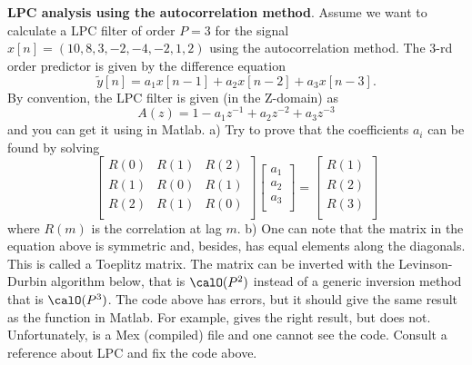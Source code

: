 \begin{exercises}
\item \textbf{LPC analysis using the autocorrelation method}. Assume
we want to calculate a LPC filter of order $P=3$ for the signal
$x[n]=(10, 8, 3, -2, -4, -2, 1, 2)$ using the autocorrelation
method. The 3-rd order predictor is given by the difference
equation
$$\tilde{y}[n]=a_1 x[n-1] + a_2 x[n-2] + a_3 x[n-3].$$
By convention, the LPC filter is given (in the Z-domain) as
$$A(z)=1 - a_1 z^{-1} + a_2 z^{-2} + a_3 z^{-3}$$
and you can get it using  in Matlab. a) Try to prove
that the coefficients $a_i$ can be found by solving
$$
\begin{bmatrix}
R(0) & R(1) & R(2) \\
R(1) & R(0) & R(1) \\
R(2) & R(1) & R(0) \\
\end{bmatrix}
\begin{bmatrix}
a_1 \\
a_2 \\
a_3\\
\end{bmatrix}
=
\begin{bmatrix}
R(1)\\
R(2)\\
R(3)\\
\end{bmatrix}
$$
where $R(m)$ is the correlation at lag $m$. 
b) One can note that the matrix in
the equation above is symmetric and, besides, has equal elements
along the diagonals. This is called a Toeplitz matrix. The matrix
can be inverted with the Levinson-Durbin algorithm below, that is
$\calO(P^2)$ instead of a generic inversion method that is
$\calO(P^3)$.
The code above has errors, but it should give the same result as
the function  in Matlab. For example,
 gives the right result, but
 does not. Unfortunately,
 is a Mex (compiled) file and one cannot see the
code. Consult a reference about LPC and fix the code above.

\end{exercises}  %